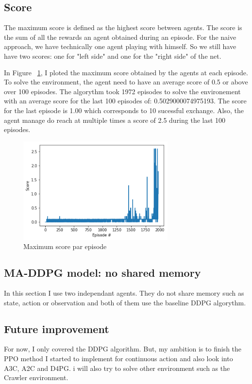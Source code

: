 \documentclass[12pt]{article}
\begin{document}
\subsection{Score}
The maximum score is defined as the highest score between agents. The score is the sum of all the rewards an agent obtained during an episode. For the naive approach, we have technically one agent playing with himself. So we still have have two scores: one for "left side" and one for the "right side" of the net.

In Figure ~\ref{fig:ddpg}, I ploted the maximum score obtained by the agents at each episode. 
To solve the environment, the agent need to have an average score of 0.5 or above over 100 episodes. The algorythm took 1972 episodes to solve the environement with an average score for the last 100 episodes of: 0.5029000074975193.	The score for the last episode is 1.00 which corresponds to 10 sucessful exchange. Also, the agent manage do reach at multiple times a score of 2.5 during the last 100 episodes.

\begin{center}
\begin{figure}[H]
  \center
  \includegraphics[width=0.7\textwidth]{../PNG/ddpg.png}
  \caption{Maximum score par episode}
  \label{fig:ddpg}
\end{figure}
\end{center}


\subsection{MA-DDPG model: no shared memory} 
In this section I use two independant agents. They do not share memory such as state, action or observation and both of them use the baseline DDPG algorythm.


\subsection{Future improvement}
For now, I only covered the DDPG\cite{LillicrapHPHETS15} algorithm. But, my ambition is to finish the PPO method\cite{ClaveraRS0AA18} I started to implement for continuous action and also look into A3C\cite{MnihBMGLHSK16}, A2C\cite{MnihBMGLHSK16} and D4PG\cite{Barth2018}. i will also try to solve other environment such as the Crawler environment.


\end{document}
